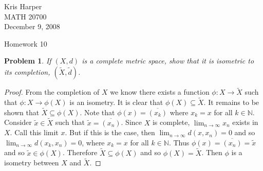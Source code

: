 \documentclass{article}
\newtheorem{problem}{Problem}
\begin{document}
\begin{flushright}
Kris Harper\\

MATH 20700\\

December 9, 2008
\end{flushright}

\begin{center}
Homework 10
\end{center}

\begin{flushleft}

\begin{problem}
If $(X, d)$ is a complete metric space, show that it is isometric to its completion, $(\widetilde{X}, \widetilde{d})$.
\end{problem}
\begin{proof}
From the completion of $X$ we know there exists a function $\phi : X \rightarrow \widetilde{X}$ such that $\phi : X \rightarrow \phi (X)$ is an isometry. It is clear that $\phi (X) \subseteq \widetilde{X}$. It remains to be shown that $\widetilde{X} \subseteq \phi(X)$. Note that $\phi (x) = \overline{(x_k)}$ where $x_k = x$ for all $k \in \mathbb{N}$. Consider $\widetilde{x} \in \widetilde{X}$ such that $\widetilde{x} = \overline{(x_n)}$. Since $X$ is complete, $\lim_{n \rightarrow \infty} x_n$ exists in $X$. Call this limit $x$. But if this is the case, then $\lim_{n \rightarrow \infty} d(x, x_n) = 0$ and so $\lim_{n \rightarrow \infty} d(x_k, x_n) = 0$, where $x_k = x$ for all $k \in \mathbb{N}$. Thus $\phi (x) = \overline{(x_n)} = \widetilde{x}$ and so $\widetilde{x} \in \phi(X)$. Therefore $\widetilde{X} \subseteq \phi(X)$ and so $\phi(X) = \widetilde{X}$. Then $\phi$ is a isometry between $X$ and $\widetilde{X}$.
\end{proof}


\end{flushleft}
\end{document}
